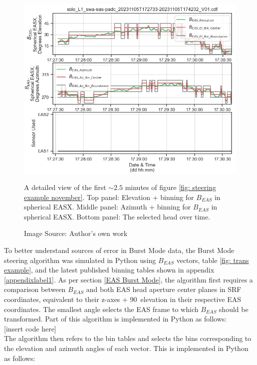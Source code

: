 \begin{figure}[h!]
    \centering
    \centerfloat
    \includegraphics[width=1.05\linewidth]{figures/Steering Example Detail Start.png}
    \caption{A detailed view of the first \(\sim2.5\) minutes of figure \ref{fig: steering example november}. Top panel: Elevation + binning for \(B_{EAS}\) in spherical EASX. Middle panel: Azimuth + binning for \(B_{EAS}\) in spherical EASX. Bottom panel: The selected head over time.}
    \caption*{Image Source: Author's own work}
    \label{fig: steering example november detail}
\end{figure}

To better understand sources of error in Burst Mode data, the Burst Mode steering algorithm was simulated in Python using \(B_{EAS}\) vectors, table \ref{fig: trans example}, and the latest published binning tables shown in appendix \ref{appendixlabel1}. As per section \ref{EAS Burst Mode}, the algorithm first requires a comparison between \(B_{EAS}\) and both EAS head aperture center planes in SRF coordinates, equivalent to their z-axes + 90\degree\ elevation in their respective EAS coordinates. The smallest angle selects the EAS frame to which \(B_{EAS}\) should be transformed. Part of this algorithm is implemented in Python as follows:
\\

[insert code here]
\\

The algorithm then refers to the bin tables and selects the bins corresponding to the elevation and azimuth angles of each vector. This is implemented in Python as follows:
\\


